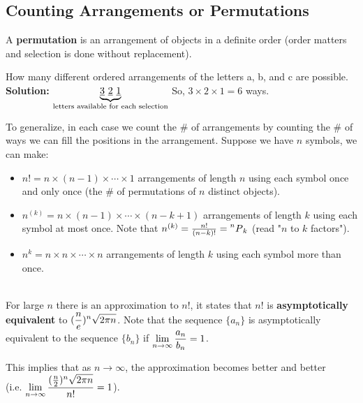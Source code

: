 \subsection{Counting Arrangements or Permutations}

\begin{definition}[Permutation]
    A \textbf{permutation} is an arrangement of objects in a definite order (order matters and selection is done without replacement).
\end{definition}

\begin{example}
    How many different ordered arrangements of the letters a, b, and c are possible.    \\
    \textbf{Solution: } $\underbrace{\text{\underline{3} \underline{2} \underline{1}}}_{\text{letters available for each selection}}$
    So, $3 \times 2 \times 1 = 6$ ways. \\
\end{example}

To generalize, in each case we count the \# of arrangements by counting the \# of ways we can 
fill the positions in the arrangement. Suppose we have $n$ symbols, we can make:
\begin{itemize}
    \item $n! = n \times (n-1) \times \cdots \times 1$ arrangements of length $n$ using each symbol once and only once
    (the \# of permutations of $n$ distinct objects).
    \item $n^{(k)} = n \times (n-1) \times \cdots \times (n-k+1)$ arrangements of length $k$ using each symbol at most once.
    Note that $n^{(k)} = \frac{n!}{(n-k)!} = \prescript{n}{}{P}_{k}$ (read "$n$ to $k$ factors").
    \item $n^k = n \times n \times \cdots \times n$ arrangements of length $k$ using each symbol more than once.    \\
\end{itemize}

\begin{theorem}
    \phantom{}  \\
    For large $n$ there is an approximation to $n!$, it states that $n!$ is \textbf{asymptotically equivalent} to $\displaystyle (\frac{n}{e})^n \sqrt{2 \pi n}$.
    Note that the sequence $\{a_n\}$ is asymptotically equivalent to the sequence $\{b_n\}$ if $\displaystyle \lim_{n \to \infty}\frac{a_n}{b_n} = 1$.
\end{theorem}

\begin{note}
    This implies that as $n \to \infty$, the approximation becomes better and better    \\
    (i.e. $\displaystyle \lim_{n \to \infty}\frac{(\frac{n}{2})^n \sqrt{2 \pi n}}{n!} = 1$). \\
\end{note}

